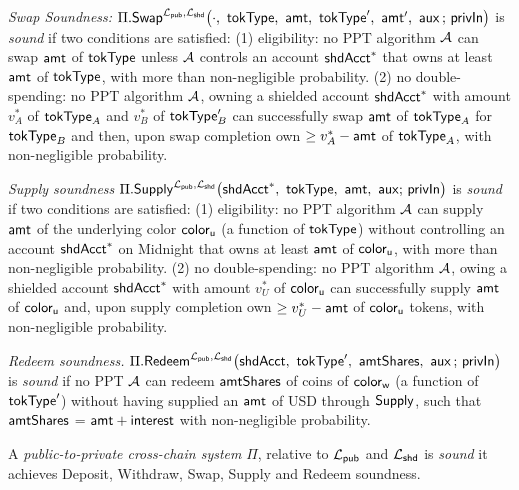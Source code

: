 \begin{definition}
\label{def:swap} \emph{Swap Soundness:}
$\Pi.\Swap^{\Lpub, \Lshd}\bigl(\cdot\bc \tokType\bc \amt\bc
    \tokTypeB\bc \amtB\bc \auxx \,;\, \privIn\bigr)$ is \emph{sound}
    if   two conditions are satisfied:
      (1) eligibility: no PPT algorithm $\mathcal{A}$ can  swap $\mathsf{amt}$ of $\mathsf{tokType}$ unless $\mathcal{A}$ controls an account $\mathsf{shdAcct}^*$ that owns at least $\mathsf{amt}$ of $\mathsf{tokType}$, with more than non-negligible probability.
      (2) no double-spending: no PPT algorithm $\mathcal{A}$,   owning a shielded account $\mathsf{shdAcct}^*$ with amount $v^*_A$  of
      $\mathsf{tokType}_A$ and  $v^*_B$ of $\mathsf{tokType}'_B$ can successfully swap  $\mathsf{amt}$ of $\mathsf{tokType}_A$  for $\mathsf{tokType}_B$ and then, upon swap completion own $\geq v^*_A - \mathsf{amt}$  of $\mathsf{tokType}_A$, with non-negligible probability.
\end{definition}

\begin{definition}
\label{def:supplysound}
\emph{Supply soundness}
$\Pi.\Supply^{\Lpub, \Lshd}\bigl(\shdAcct^*\bc \tokType\bc \amt\bc \auxx;\, \privIn\bigr)$
is \emph{sound}  if   two conditions are satisfied: (1) eligibility: no PPT algorithm $\mathcal{A}$ can  supply $\mathsf{amt}$ of the underlying
color $\mathsf{color}_{\mathsf{u}}$ (a function of $\mathsf{tokType}$) without controlling an account $\mathsf{shdAcct}^*$ on Midnight that owns at least $\mathsf{amt}$ of
$\mathsf{color}_{\mathsf{u}}$, with more than non-negligible probability.  (2) no double-spending: no PPT algorithm $\mathcal{A}$,   owing a shielded account $\mathsf{shdAcct}^*$ with amount $v^*_U$  of   $\mathsf{color}_{\mathsf{u}}$ can successfully supply  $\mathsf{amt}$ of $\mathsf{color}_{\mathsf{u}}$ and, upon supply completion own $\geq v^*_U-\mathsf{amt}$ of $\mathsf{color}_{\mathsf{u}}$ tokens,  with non-negligible probability.
\end{definition}

\begin{definition}
\label{def:redeemsound}
\emph{Redeem soundness.}
$\Pi.\Redeem^{\Lpub, \Lshd}\bigl(\shdAcct\bc \tokType'\bc \amtShares\bc \auxx
      \,;\, \privIn\bigr)$ is \emph{sound} if no PPT $\mathcal{A}$ can
      redeem $\mathsf{amtShares}$ of coins of $\mathsf{color}_{\mathsf{w}}$ (a function of $\mathsf{tokType}'$) without having supplied an $\mathsf{amt}$ of USD  through $\mathsf{Supply}$, such that
      $\mathsf{amtShares}$ = $\mathsf{amt}+ \mathsf{interest}$ with non-negligible probability.

 \end{definition}

\begin{definition}
\label{def:totalsoundness}
    A \emph{public-to-private cross-chain \Payment{} system} $\Pi$, relative to $\mathcal{L}_{\mathsf{pub}}$ and $\mathcal{L}_{\mathsf{shd}}$ is  \emph{sound} it achieves  Deposit, Withdraw, Swap, Supply and Redeem soundness.
\end{definition}

